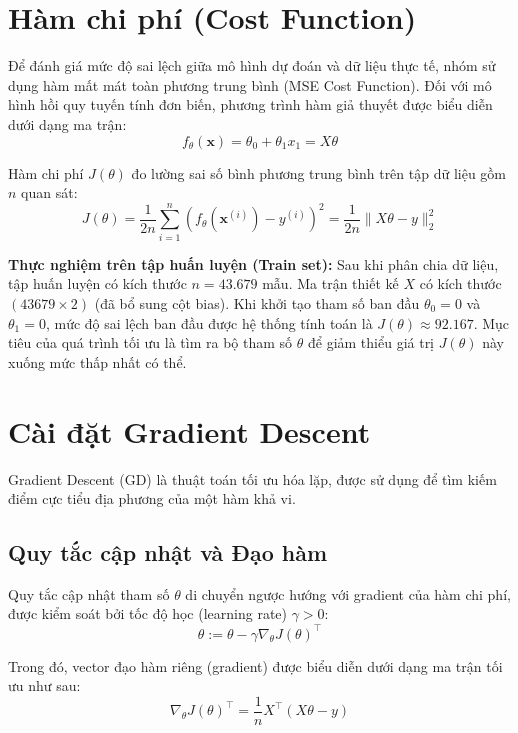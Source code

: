 \section{Hàm chi phí (Cost Function)}

Để đánh giá mức độ sai lệch giữa mô hình dự đoán và dữ liệu thực tế, nhóm sử dụng hàm mất mát toàn phương trung bình (MSE Cost Function). Đối với mô hình hồi quy tuyến tính đơn biến, phương trình hàm giả thuyết được biểu diễn dưới dạng ma trận:
\begin{equation}
    f_\theta(\mathbf{x}) = \theta_0 + \theta_1 x_1 = X\theta
\end{equation}

Hàm chi phí $J(\theta)$ đo lường sai số bình phương trung bình trên tập dữ liệu gồm $n$ quan sát:
\begin{equation}
    J(\theta) = \frac{1}{2n}\sum_{i=1}^{n}\left(f_{\theta}(\mathbf{x}^{(i)}) - y^{(i)}\right)^2 = \frac{1}{2n}\|X\theta - y\|_2^2
\end{equation}

\textbf{Thực nghiệm trên tập huấn luyện (Train set):} Sau khi phân chia dữ liệu, tập huấn luyện có kích thước $n = 43.679$ mẫu. Ma trận thiết kế $X$ có kích thước $(43679 \times 2)$ (đã bổ sung cột bias). Khi khởi tạo tham số ban đầu $\theta_0 = 0$ và $\theta_1 = 0$, mức độ sai lệch ban đầu được hệ thống tính toán là $J(\theta) \approx 92.167$. Mục tiêu của quá trình tối ưu là tìm ra bộ tham số $\theta$ để giảm thiểu giá trị $J(\theta)$ này xuống mức thấp nhất có thể.


\section{Cài đặt Gradient Descent}

Gradient Descent (GD) là thuật toán tối ưu hóa lặp, được sử dụng để tìm kiếm điểm cực tiểu địa phương của một hàm khả vi.

\subsection{Quy tắc cập nhật và Đạo hàm}
Quy tắc cập nhật tham số $\theta$ di chuyển ngược hướng với gradient của hàm chi phí, được kiểm soát bởi tốc độ học (learning rate) $\gamma > 0$:
\begin{equation}
    \theta := \theta - \gamma \nabla_{\theta}J(\theta)^\top
\end{equation}

Trong đó, vector đạo hàm riêng (gradient) được biểu diễn dưới dạng ma trận tối ưu như sau:
\begin{equation}
    \nabla_{\theta}J(\theta)^\top = \frac{1}{n}X^\top(X\theta - y)
\end{equation}

